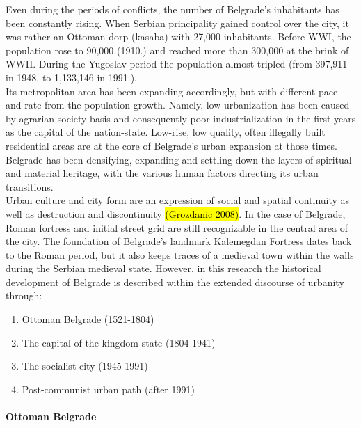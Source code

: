 \documentclass[11pt]{report}
\begin{document}
Even during the periods of conflicts, the number of Belgrade's inhabitants has been constantly rising. When Serbian principality gained control over the city, it was rather an Ottoman dorp (kasaba) with 27,000 inhabitants. Before WWI, the population rose to 90,000 (1910.) and reached more than 300,000 at the brink of WWII.
During the Yugoslav period the population almost tripled (from 397,911 in 1948. to 1,133,146 in 1991.).
\\
Its metropolitan area has been expanding accordingly, but with different pace and rate from the population growth. Namely, low urbanization has been caused by agrarian society basis and consequently poor industrialization in the first years as the capital of the nation-state.
Low-rise, low quality, often illegally built residential areas are at the core of Belgrade's urban expansion at those times. Belgrade has been densifying, expanding and settling down the layers of spiritual and material heritage, with the various human factors directing its urban transitions.
\\
Urban culture and city form are an expression of social and spatial continuity as well as destruction and discontinuity \hl{(Grozdanic 2008)}. In the case of Belgrade, Roman fortress and initial street grid are still recognizable in the central area of the city.
The foundation of Belgrade's landmark Kalemegdan Fortress dates back to the Roman period, but it also keeps traces of a medieval town within the walls during the Serbian medieval state.
However, in this research the historical development of Belgrade is described within the extended discourse of urbanity through:
\begin{enumerate}
\item Ottoman Belgrade (1521-1804)
\item The capital of the kingdom state (1804-1941)
\item The socialist city (1945-1991)
\item Post-communist urban path (after 1991)
\end{enumerate}

\paragraph{Ottoman Belgrade}
\end{document}
